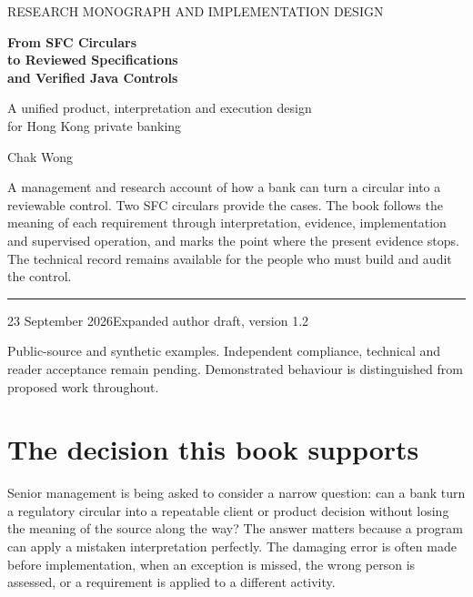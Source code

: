 \documentclass[12pt,a4paper,oneside,openany]{book}
\begin{document}
\raggedbottom
\frontmatter
\hypersetup{pageanchor=false}
\begin{titlepage}
\vspace*{15mm}
{\sffamily\color{teal}\large RESEARCH MONOGRAPH AND IMPLEMENTATION DESIGN\par}
\vspace{12mm}
{\sffamily\bfseries\color{navy}\fontsize{32}{37}\selectfont From SFC Circulars\\to Reviewed Specifications\\and Verified Java Controls\par}
\vspace{12mm}
{\Large A unified product, interpretation and execution design\\for Hong Kong private banking\par}
\vspace{12mm}
{\large Chak Wong\par}
\vfill
\begin{minipage}{0.94\textwidth}
A management and research account of how a bank can turn a circular into a
reviewable control. Two SFC circulars provide the cases. The book follows the
meaning of each requirement through interpretation, evidence, implementation
and supervised operation, and marks the point where the present evidence stops.
The technical record remains available for the people who must build and audit
the control.
\end{minipage}
\vspace{16mm}
\hrule
\vspace{5mm}
23 September 2026\hfill Expanded author draft, version 1.2\par
\small Public-source and synthetic examples. Independent compliance, technical
and reader acceptance remain pending. Demonstrated behaviour is distinguished
from proposed work throughout.
\end{titlepage}
\hypersetup{pageanchor=true}
\chapter*{The decision this book supports}
Senior management is being asked to consider a narrow question: can a bank turn
a regulatory circular into a repeatable client or product decision without
losing the meaning of the source along the way? The answer matters because a
program can apply a mistaken interpretation perfectly. The damaging error is
often made before implementation, when an exception is missed, the wrong person
is assessed, or a requirement is applied to a different activity.
\end{document}
